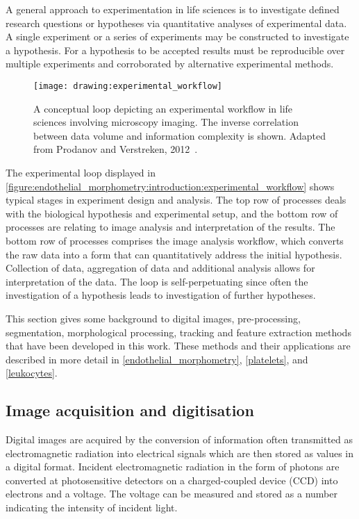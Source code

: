 A general approach to experimentation in life sciences is to investigate defined research questions or hypotheses via quantitative analyses of experimental data. A single experiment or a series of experiments may be constructed to investigate a hypothesis. For a hypothesis to be accepted results must be reproducible over multiple experiments and corroborated by alternative experimental methods.

\begin{figure}[htbp!]
	\centering
	\texttt{[image: drawing:experimental\_workflow]}
	\caption[Experimental workflow in life science imaging]{A conceptual loop depicting an experimental workflow in life sciences involving microscopy imaging. The inverse correlation between data volume and information complexity is shown. Adapted from Prodanov and Verstreken, 2012~\cite{Prodanov2012}.}
	\label{figure:endothelial_morphometry:introduction:experimental_workflow}
\end{figure}

The experimental loop displayed in \autoref{figure:endothelial_morphometry:introduction:experimental_workflow} shows typical stages in experiment design and analysis. The top row of processes deals with the biological hypothesis and experimental setup, and the bottom row of processes are relating to image analysis and interpretation of the results. The bottom row of processes comprises the image analysis workflow, which converts the raw data into a form that can quantitatively address the initial hypothesis. Collection of data, aggregation of data and additional analysis allows for interpretation of the data. The loop is self-perpetuating since often the investigation of a hypothesis leads to investigation of further hypotheses.

This section gives some background to digital images, pre-processing, segmentation, morphological processing, tracking and feature extraction methods that have been developed in this work. These methods and their applications are described in more detail in \autoref{endothelial_morphometry}, \autoref{platelets}, and \autoref{leukocytes}.

\subsection{Image acquisition and digitisation}
\label{introduction:image_processing:image_acquisition}
Digital images are acquired by the conversion of information often transmitted as electromagnetic radiation into electrical signals which are then stored as values in a digital format. Incident electromagnetic radiation in the form of photons are converted at photosensitive detectors on a charged-coupled device (CCD) into electrons and a voltage. The voltage can be measured and stored as a number indicating the intensity of incident light.

